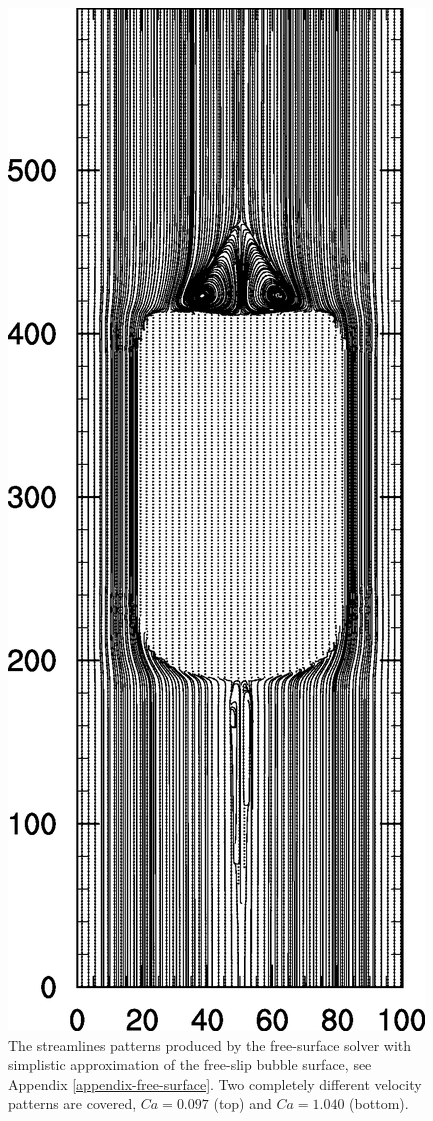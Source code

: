 \documentclass{article}
\begin{document}
\begin{description}
\begin{figure}[htb!]
\includegraphics[angle=90,width=\textwidth]{Figures/performed_ca1040.eps}
\caption{The streamlines patterns produced by the free-surface solver with simplistic approximation
of the free-slip bubble surface, see Appendix \ref{appendix-free-surface}. Two completely different
velocity patterns are covered, $Ca=0.097$ (top) and $Ca=1.040$ (bottom).
\label{fig:streamlines:tweaked:velocity}}
\end{figure}


\end{description}
\end{document}
